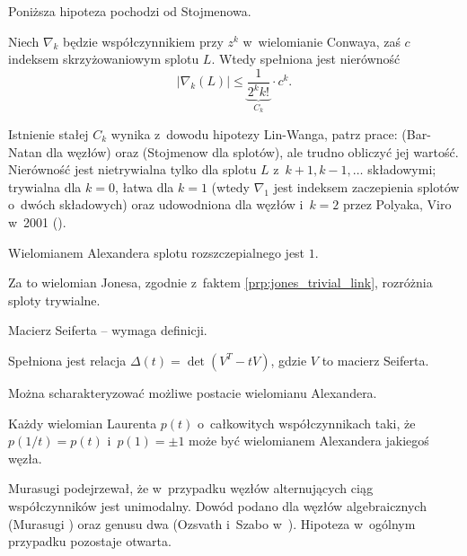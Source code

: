 Poniższa hipoteza pochodzi od Stojmenowa.

\begin{conjecture}
	Niech $\nabla_k$ będzie współczynnikiem przy $z^k$ w~wielomianie Conwaya, zaś $c$ indeksem skrzyżowaniowym splotu $L$.
	Wtedy spełniona jest nierówność
	\begin{equation}
		|\nabla_k(L)| \le \underbrace{\frac{1}{2^kk!}}_{C_k} \cdot c^k.
	\end{equation}
\end{conjecture}

Istnienie stałej $C_k$ wynika z~dowodu hipotezy Lin-Wanga, patrz prace: \cite{barnatan_95} (Bar-Natan dla węzłów) oraz \cite{stoimenow_01} (Stojmenow dla splotów), ale trudno obliczyć jej wartość.
Nierówność jest nietrywialna tylko dla splotu $L$ z~$k+1, k-1, \ldots$ składowymi; trywialna dla $k = 0$, łatwa dla $k=1$ (wtedy $\nabla_1$ jest indeksem zaczepienia splotów o~dwóch składowych) oraz udowodniona dla węzłów i~$k=2$ przez Polyaka, Viro w~2001 (\cite{polyak01}).

\begin{proposition}
	Wielomianem Alexandera splotu rozszczepialnego jest $1$.
\end{proposition}

Za to wielomian Jonesa, zgodnie z~faktem \ref{prp:jones_trivial_link}, rozróżnia sploty trywialne.

Macierz Seiferta -- wymaga definicji.
\begin{proposition}
	Spełniona jest relacja $\Delta(t)=\det(V^T-tV)$, gdzie $V$ to macierz Seiferta.
\end{proposition}

Można scharakteryzować możliwe postacie wielomianu Alexandera.

\begin{proposition}[Hosokowa, 1958]
	Każdy wielomian Laurenta $p(t)$ o~całkowitych współczynnikach taki, że $p(1/t) = p(t)$ i~$p(1) = \pm 1$ może być wielomianem Alexandera jakiegoś węzła.
\end{proposition}

Murasugi podejrzewał, że w~przypadku węzłów alternujących ciąg współczynników jest unimodalny.
Dowód podano dla węzłów algebraicznych (Murasugi \cite{murasugi85}) oraz genusu dwa (Ozsvath i~Szabo w~\cite{ozsvath03}).
Hipoteza w~ogólnym przypadku pozostaje otwarta.

